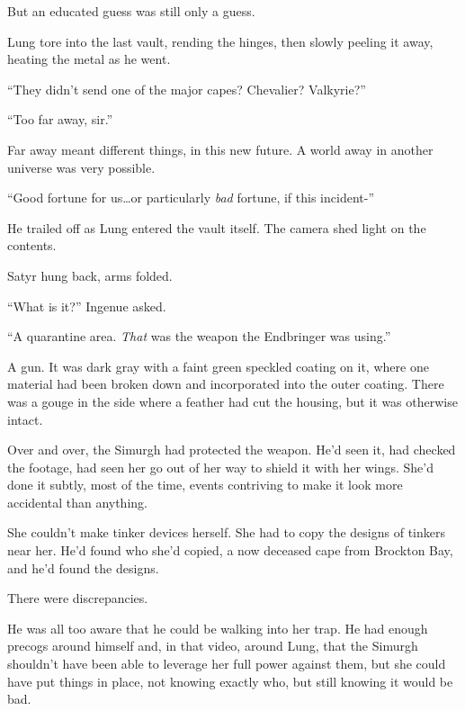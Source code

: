 But an educated guess was still only a guess.



Lung tore into the last vault, rending the hinges, then slowly peeling it away, heating the metal as he went.



``They didn't send one of the major capes?  Chevalier?  Valkyrie?''



``Too far away, sir.''



Far away meant different things, in this new future.  A world away in another universe was very possible.



``Good fortune for us\ldots or particularly \emph{bad} fortune, if this incident-''



He trailed off as Lung entered the vault itself.  The camera shed light on the contents.



Satyr hung back, arms folded.



``What is it?''  Ingenue asked.



``A quarantine area.  \emph{That} was the weapon the Endbringer was using.''



A gun.  It was dark gray with a faint green speckled coating on it, where one material had been broken down and incorporated into the outer coating.  There was a gouge in the side where a feather had cut the housing, but it was otherwise intact.



Over and over, the Simurgh had protected the weapon.  He'd seen it, had checked the footage, had seen her go out of her way to shield it with her wings.  She'd done it subtly, most of the time, events contriving to make it look more accidental than anything.



She couldn't make tinker devices herself.  She had to copy the designs of tinkers near her.  He'd found who she'd copied, a now deceased cape from Brockton Bay, and he'd found the designs.



There were discrepancies.



He was all too aware that he could be walking into her trap.  He had enough precogs around himself and, in that video, around Lung, that the Simurgh shouldn't have been able to leverage her full power against them, but she could have put things in place, not knowing exactly who, but still knowing it would be bad.



